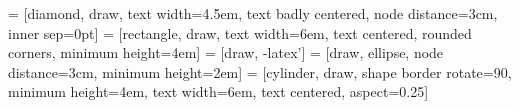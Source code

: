  = [diamond, draw, 
text width=4.5em, text badly centered, node distance=3cm, inner sep=0pt]
 = [rectangle, draw, 
text width=6em, text centered, rounded corners, minimum height=4em]
 = [draw, -latex']
 = [draw, ellipse, node distance=3cm,
minimum height=2em]
 = [cylinder, draw, shape border rotate=90, minimum height=4em, text width=6em, text centered,
aspect=0.25]


